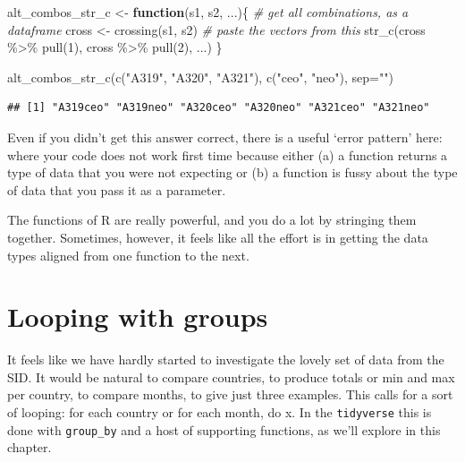 \documentclass[
]{book}
\newenvironment{Shaded}{\begin{snugshade}}{\end{snugshade}}
\newcommand{\AttributeTok}[1]{\textcolor[rgb]{0.77,0.63,0.00}{#1}}
\newcommand{\CommentTok}[1]{\textcolor[rgb]{0.56,0.35,0.01}{\textit{#1}}}
\newcommand{\ControlFlowTok}[1]{\textcolor[rgb]{0.13,0.29,0.53}{\textbf{#1}}}
\newcommand{\DecValTok}[1]{\textcolor[rgb]{0.00,0.00,0.81}{#1}}
\newcommand{\FunctionTok}[1]{\textcolor[rgb]{0.00,0.00,0.00}{#1}}
\newcommand{\NormalTok}[1]{#1}
\newcommand{\OtherTok}[1]{\textcolor[rgb]{0.56,0.35,0.01}{#1}}
\newcommand{\SpecialCharTok}[1]{\textcolor[rgb]{0.00,0.00,0.00}{#1}}
\newcommand{\StringTok}[1]{\textcolor[rgb]{0.31,0.60,0.02}{#1}}
\begin{document}
\begin{Shaded}
\begin{Highlighting}[]
\NormalTok{alt\_combos\_str\_c }\OtherTok{\textless{}{-}} \ControlFlowTok{function}\NormalTok{(s1, s2, ...)\{}
  \CommentTok{\# get all combinations, as a dataframe}
\NormalTok{  cross }\OtherTok{\textless{}{-}} \FunctionTok{crossing}\NormalTok{(s1, s2)}
  \CommentTok{\# paste the vectors from this }
  \FunctionTok{str\_c}\NormalTok{(cross }\SpecialCharTok{\%\textgreater{}\%} \FunctionTok{pull}\NormalTok{(}\DecValTok{1}\NormalTok{),}
\NormalTok{        cross }\SpecialCharTok{\%\textgreater{}\%} \FunctionTok{pull}\NormalTok{(}\DecValTok{2}\NormalTok{),}
\NormalTok{        ...)}
\NormalTok{\}}

\FunctionTok{alt\_combos\_str\_c}\NormalTok{(}\FunctionTok{c}\NormalTok{(}\StringTok{"A319"}\NormalTok{, }\StringTok{"A320"}\NormalTok{, }\StringTok{"A321"}\NormalTok{), }\FunctionTok{c}\NormalTok{(}\StringTok{"ceo"}\NormalTok{, }\StringTok{"neo"}\NormalTok{), }\AttributeTok{sep=}\StringTok{""}\NormalTok{)}
\end{Highlighting}
\end{Shaded}

\begin{verbatim}
## [1] "A319ceo" "A319neo" "A320ceo" "A320neo" "A321ceo" "A321neo"
\end{verbatim}

Even if you didn't get this answer correct, there is a useful `error pattern' here: where your code does not work first time because either (a) a function returns a type of data that you were not expecting or (b) a function is fussy about the type of data that you pass it as a parameter.

The functions of R are really powerful, and you do a lot by stringing them together. Sometimes, however, it feels like all the effort is in getting the data types aligned from one function to the next.

\hypertarget{groups}{%
\chapter{Looping with groups}\label{groups}}

It feels like we have hardly started to investigate the lovely set of data from the SID. It would be natural to compare countries, to produce totals or min and max per country, to compare months, to give just three examples. This calls for a sort of looping: for each country or for each month, do x. In the \texttt{tidyverse} this is done with \texttt{group\_by} and a host of supporting functions, as we'll explore in this chapter.
\end{document}
